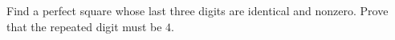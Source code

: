 Find a perfect square whose last three digits are identical and nonzero. Prove that the repeated digit must be $4$.
